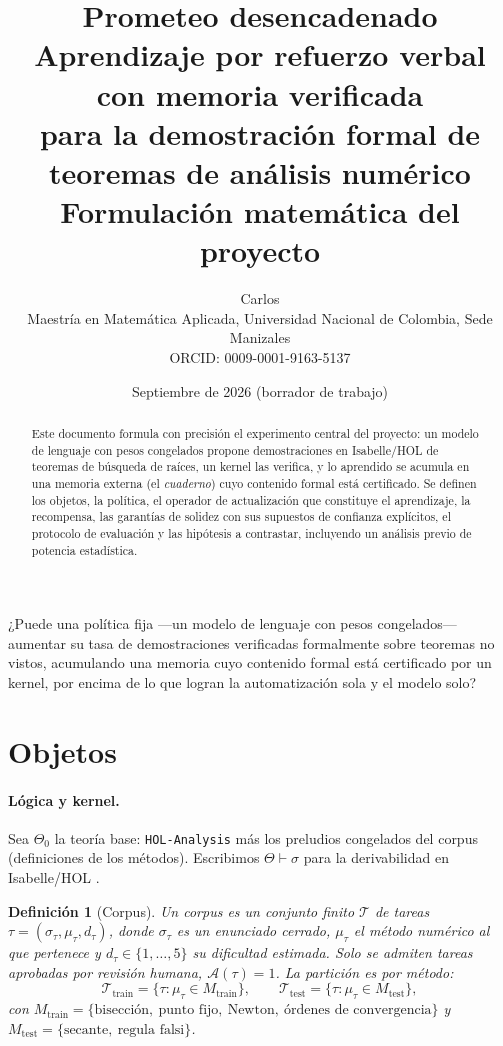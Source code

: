 \documentclass[11pt]{article}
\title{\textbf{Prometeo desencadenado}\\[4pt]
\large Aprendizaje por refuerzo verbal con memoria verificada\\
para la demostración formal de teoremas de análisis numérico\\[8pt]
\normalsize Formulación matemática del proyecto}
\author{Carlos\\
\small Maestría en Matemática Aplicada, Universidad Nacional de Colombia, Sede Manizales\\
\small ORCID: 0009-0001-9163-5137}
\date{Septiembre de 2026 \quad(borrador de trabajo)}
\newtheorem{definition}{Definición}[section]
\theoremstyle{remark}
\newcommand{\T}{\mathcal{T}}
\newcommand{\A}{\mathcal{A}}
\newcommand{\1}{\mathbb{1}}
\begin{document}
\maketitle

\begin{abstract}
Este documento formula con precisión el experimento central del proyecto: un modelo de lenguaje con pesos congelados propone demostraciones en Isabelle/HOL de teoremas de búsqueda de raíces, un kernel las verifica, y lo aprendido se acumula en una memoria externa (el \emph{cuaderno}) cuyo contenido formal está certificado. Se definen los objetos, la política, el operador de actualización que constituye el aprendizaje, la recompensa, las garantías de solidez con sus supuestos de confianza explícitos, el protocolo de evaluación y las hipótesis a contrastar, incluyendo un análisis previo de potencia estadística.
\end{abstract}

\begin{pregunta}
¿Puede una política fija ---un modelo de lenguaje con pesos congelados--- aumentar su tasa de demostraciones verificadas formalmente sobre teoremas no vistos, acumulando una memoria cuyo contenido formal está certificado por un kernel, por encima de lo que logran la automatización sola y el modelo solo?
\end{pregunta}

\section{Objetos}

\paragraph{Lógica y kernel.} Sea $\Theta_0$ la teoría base: \texttt{HOL-Analysis} más los preludios congelados del corpus (definiciones de los métodos). Escribimos $\Theta \vdash \sigma$ para la derivabilidad en Isabelle/HOL \cite{nipkow2002}.

\begin{definition}[Corpus]
Un corpus es un conjunto finito $\T$ de tareas $\tau=(\sigma_\tau,\mu_\tau,d_\tau)$, donde $\sigma_\tau$ es un enunciado cerrado, $\mu_\tau$ el método numérico al que pertenece y $d_\tau\in\{1,\dots,5\}$ su dificultad estimada. Solo se admiten tareas aprobadas por revisión humana, $\A(\tau)=1$. La partición es por método:
\[
\T_{\mathrm{train}}=\{\tau:\mu_\tau\in M_{\mathrm{train}}\},\qquad
\T_{\mathrm{test}}=\{\tau:\mu_\tau\in M_{\mathrm{test}}\},
\]
con $M_{\mathrm{train}}=\{\text{bisección},\ \text{punto fijo},\ \text{Newton},\ \text{órdenes de convergencia}\}$ y $M_{\mathrm{test}}=\{\text{secante},\ \text{regula falsi}\}$.
\end{definition}
\end{document}
